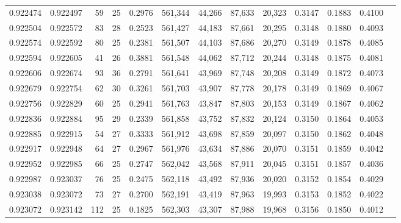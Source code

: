 \begin{tabular}{rrrrrrrrrrrrr}
0.922474 & 0.922497 &    59 &  25 &                                     0.2976 & 561,344 &  44,266 &  87,633 &  20,323 & 0.3147 & 0.1883 & 0.4100 \\
0.922504 & 0.922572 &    83 &  28 &                                     0.2523 & 561,427 &  44,183 &  87,661 &  20,295 & 0.3148 & 0.1880 & 0.4093 \\
0.922574 & 0.922592 &    80 &  25 &                                     0.2381 & 561,507 &  44,103 &  87,686 &  20,270 & 0.3149 & 0.1878 & 0.4085 \\
0.922594 & 0.922605 &    41 &  26 &                                     0.3881 & 561,548 &  44,062 &  87,712 &  20,244 & 0.3148 & 0.1875 & 0.4081 \\
0.922606 & 0.922674 &    93 &  36 &                                     0.2791 & 561,641 &  43,969 &  87,748 &  20,208 & 0.3149 & 0.1872 & 0.4073 \\
0.922679 & 0.922754 &    62 &  30 &                                     0.3261 & 561,703 &  43,907 &  87,778 &  20,178 & 0.3149 & 0.1869 & 0.4067 \\
0.922756 & 0.922829 &    60 &  25 &                                     0.2941 & 561,763 &  43,847 &  87,803 &  20,153 & 0.3149 & 0.1867 & 0.4062 \\
0.922836 & 0.922884 &    95 &  29 &                                     0.2339 & 561,858 &  43,752 &  87,832 &  20,124 & 0.3150 & 0.1864 & 0.4053 \\
0.922885 & 0.922915 &    54 &  27 &                                     0.3333 & 561,912 &  43,698 &  87,859 &  20,097 & 0.3150 & 0.1862 & 0.4048 \\
0.922917 & 0.922948 &    64 &  27 &                                     0.2967 & 561,976 &  43,634 &  87,886 &  20,070 & 0.3151 & 0.1859 & 0.4042 \\
0.922952 & 0.922985 &    66 &  25 &                                     0.2747 & 562,042 &  43,568 &  87,911 &  20,045 & 0.3151 & 0.1857 & 0.4036 \\
0.922987 & 0.923037 &    76 &  25 &                                     0.2475 & 562,118 &  43,492 &  87,936 &  20,020 & 0.3152 & 0.1854 & 0.4029 \\
0.923038 & 0.923072 &    73 &  27 &                                     0.2700 & 562,191 &  43,419 &  87,963 &  19,993 & 0.3153 & 0.1852 & 0.4022 \\
0.923072 & 0.923142 &   112 &  25 &                                     0.1825 & 562,303 &  43,307 &  87,988 &  19,968 & 0.3156 & 0.1850 & 0.4012 \\

\end{tabular}
